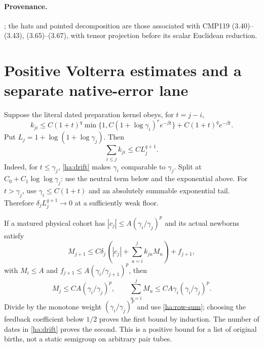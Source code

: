 \paragraph{Provenance.}
;
the hats and pointed decomposition are those associated with CMP119
(3.40)--(3.43), (3.65)--(3.67), with tensor projection before its scalar
Euclidean reduction.

\section{Positive Volterra estimates and a separate native-error lane}
\label{ha:volterra}

Suppose the literal dated preparation kernel obeys, for $t=j-i$,
\begin{equation}
 k_{ji}\leq C(1+t)^q
 \min\{1,C(1+\log\gamma_i)^r e^{-\beta t}\}
             +C(1+t)^q e^{-\beta t}.
 \label{ha:phase-kernel}
\end{equation}
Put $L_j=1+\log(1+\log\gamma_j)$.  Then
\begin{equation}
 \sum_{i\leq j}k_{ji}\leq C L_j^{q+1}.
 \label{ha:row-sum}
\end{equation}
Indeed, for $t\leq\gamma_j$, \eqref{ha:drift} makes $\gamma_i$ comparable
to $\gamma_j$.  Split at $C_0+C_1\log\log\gamma_j$: use the neutral
term below and the exponential above.  For $t>\gamma_j$, use
$\gamma_i\leq C(1+t)$ and an absolutely summable exponential tail.
Therefore $\delta_jL_j^{q+1}\to0$ at a sufficiently weak floor.

If a matured physical cohort has
$|c_j|\leq A(\gamma_i/\gamma_j)^p$ and its actual newborns satisfy
\begin{equation}
 M_{j+1}\leq C\delta_j\left(|c_j|+
                  \sum_{u=i}^jk_{ju}M_u\right)+f_{j+1},
 \label{ha:birth-rec}
\end{equation}
with $M_i\leq A$ and $f_{j+1}\leq A(\gamma_i/\gamma_{j+1})^p$, then
\begin{equation}
 M_j\leq CA(\gamma_i/\gamma_j)^p,\qquad
 \sum_{u=i}^jM_u\leq CA\gamma_i(\gamma_i/\gamma_j)^p.
 \label{ha:birth-poly}
\end{equation}
Divide by the monotone weight $(\gamma_i/\gamma_j)^p$ and use
\eqref{ha:row-sum}; choosing the feedback coefficient below $1/2$
proves the first bound by induction.  The number of dates in
\eqref{ha:drift} proves the second.  This is a positive bound for a
list of original births, not a static semigroup on arbitrary pair tubes.

